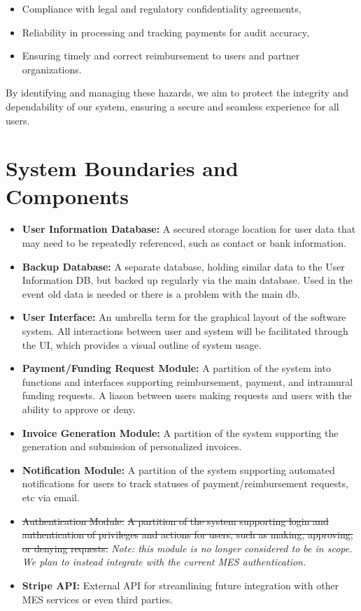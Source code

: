 \documentclass{article}
\begin{document}
\begin{itemize}
    \item Compliance with legal and regulatory confidentiality agreements,
    \item Reliability in processing and tracking payments for audit accuracy,
    \item Ensuring timely and correct reimbursement to users and partner organizations.
\end{itemize}

By identifying and managing these hazards, we aim to protect the integrity and dependability of our system, ensuring a secure and seamless experience for all users.


\section{System Boundaries and Components}

\begin{itemize}
  \item \textbf{User Information Database:} A secured storage location for user data that may need to be repeatedly referenced, such as contact or bank information.
  \item \textbf{Backup Database:} A separate database, holding similar data to the User Information DB, but backed up regularly via the main database. Used in the event old data is needed or there is a problem with the main db.
  \item \textbf{User Interface:} An umbrella term for the graphical layout of the software system. All interactions between user and system will be facilitated through the UI, which provides a visual outline of system usage.
  \item \textbf{Payment/Funding Request Module:} A partition of the system into functions and interfaces supporting reimbursement, payment, and intramural funding requests. A liason between users making requests and users with the ability to approve or deny.
  \item \textbf{Invoice Generation Module:} A partition of the system supporting the generation and submission of personalized invoices.
  \item \textbf{Notification Module:} A partition of the system supporting automated notifications for users to track statuses of payment/reimbursement requests, etc via email.
  \item \st{Authentication Module:} \st{A partition of the system supporting login and authentication of privileges and actions for users, such as making, approving, or denying requests.} \textit{Note: this module is no longer considered to be in scope. We plan to instead integrate with the current MES authentication.}
  \item \textbf{Stripe API:} External API for streamlining future integration with other MES services or even third parties.
\end{itemize}
\end{document}
